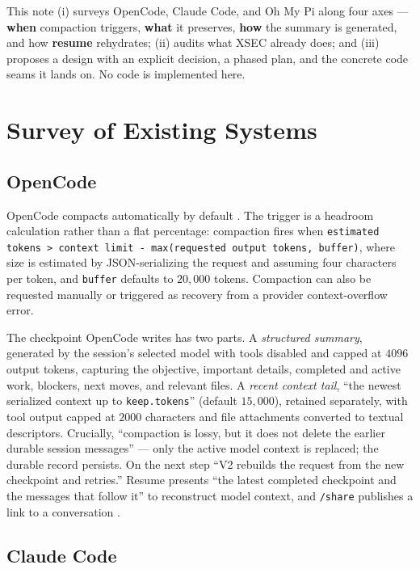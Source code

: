 \documentclass[11pt]{article}
\begin{document}
This note (i) surveys OpenCode, Claude Code, and Oh My Pi along four axes ---
\textbf{when} compaction triggers, \textbf{what} it preserves, \textbf{how} the
summary is generated, and how \textbf{resume} rehydrates; (ii) audits what XSEC
already does; and (iii) proposes a design with an explicit decision, a phased
plan, and the concrete code seams it lands on. No code is implemented here.

\section{Survey of Existing Systems}

\subsection{OpenCode}

OpenCode compacts automatically by default \cite{opencode-compaction}. The
trigger is a headroom calculation rather than a flat percentage: compaction
fires when \texttt{estimated tokens > context limit - max(requested output
tokens, buffer)}, where size is estimated by JSON-serializing the request and
assuming four characters per token, and \texttt{buffer} defaults to
$20{,}000$ tokens. Compaction can also be requested manually or triggered as
recovery from a provider context-overflow error.

The checkpoint OpenCode writes has two parts. A \emph{structured summary},
generated by the session's selected model with tools disabled and capped at
$4096$ output tokens, capturing the objective, important details, completed and
active work, blockers, next moves, and relevant files. A \emph{recent context
tail}, ``the newest serialized context up to \texttt{keep.tokens}''
(default $15{,}000$), retained separately, with tool output capped at $2000$
characters and file attachments converted to textual descriptors. Crucially,
``compaction is lossy, but it does not delete the earlier durable session
messages'' --- only the active model context is replaced; the durable record
persists. On the next step ``V2 rebuilds the request from the new checkpoint and
retries.'' Resume presents ``the latest completed checkpoint and the messages
that follow it'' to reconstruct model context, and \texttt{/share} publishes a
link to a conversation \cite{opencode-docs}.

\subsection{Claude Code}
\end{document}

